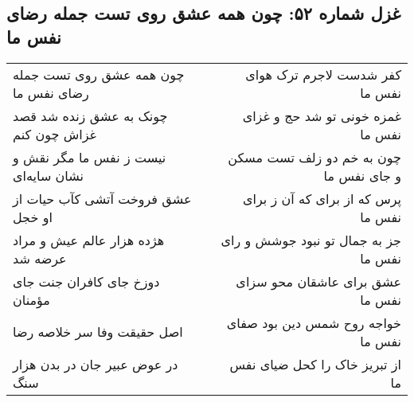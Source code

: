 \begin{center}
\section*{غزل شماره ۵۲: چون همه عشق روی تست جمله رضای نفس ما}
\label{sec:0052}
\begin{longtable}{l p{0.5cm} r}
چون همه عشق روی تست جمله رضای نفس ما
&&
کفر شدست لاجرم ترک هوای نفس ما
\\
چونک به عشق زنده شد قصد غزاش چون کنم
&&
غمزه خونی تو شد حج و غزای نفس ما
\\
نیست ز نفس ما مگر نقش و نشان سایه‌ای
&&
چون به خم دو زلف تست مسکن و جای نفس ما
\\
عشق فروخت آتشی کآب حیات از او خجل
&&
پرس که از برای که آن ز برای نفس ما
\\
هژده هزار عالم عیش و مراد عرضه شد
&&
جز به جمال تو نبود جوشش و رای نفس ما
\\
دوزخ جای کافران جنت جای مؤمنان
&&
عشق برای عاشقان محو سزای نفس ما
\\
اصل حقیقت وفا سر خلاصه رضا
&&
خواجه روح شمس دین بود صفای نفس ما
\\
در عوض عبیر جان در بدن هزار سنگ
&&
از تبریز خاک را کحل ضیای نفس ما
\\
\end{longtable}
\end{center}
